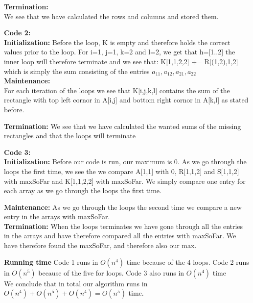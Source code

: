 \documentclass{article}
\theoremstyle{remark}
\numberwithin{equation}{section}
\begin{document}
\textbf{Termination:}
\\ We see that we have calculated the rows and columns and stored them. 

\textbf{Code 2:}
\\ \textbf{Initialization:} Before the loop, K is empty and therefore holds the correct values prior to the loop. For i=1, j=1, k=2 and l=2, we get that h=[1..2] the inner loop will therefore terminate and we see that: K[1,1,2,2] += R[(1,2),1,2] which is simply the sum consisting of the entries $ a_{11},a_{12},a_{21},a_{22}  $  
\\ \textbf{Maintenance:}
\\ For each iteration of the loops we see that K[i,j,k,l] contains the sum of the rectangle with top left cornor in A[i,j] and bottom right cornor in A[k,l] as stated before.

\textbf{Termination:} We see that we have calculated the wanted sums of the missing rectangles and that the loops will terminate

\textbf{Code 3:}
\\ \textbf{Initialization:}  
Before our code is run, our maximum is 0. As we go through the loops the first time, we see the we compare A[1,1] with 0, R[1,1,2] and S[1,1,2] with maxSoFar and K[1,1,2,2] with maxSoFar. We simply compare one entry for each array as we go through the loops the first time.

\textbf{Maintenance:} As we go through the loops the second time we compare a new entry in the arrays with maxSoFar.
\\\textbf{Termination:} When the loops terminates we have gone through all the entries in the arrays and have therefore compared all the entries with maxSoFar. We have therefore found the maxSoFar, and therefore also our max.

\textbf{Running time}
Code 1 runs in $ O(n^{4}) $ time because of the 4 loops.
Code 2 runs in $ O(n^{5}) $ because of the five for loops. 
Code 3 also runs in $ O(n^{4}) $ time
\\We conclude that in total our algorithm runs in $O(n^4)+O(n^5)+O(n^4) = O(n^5)$ time.
\end{document}
